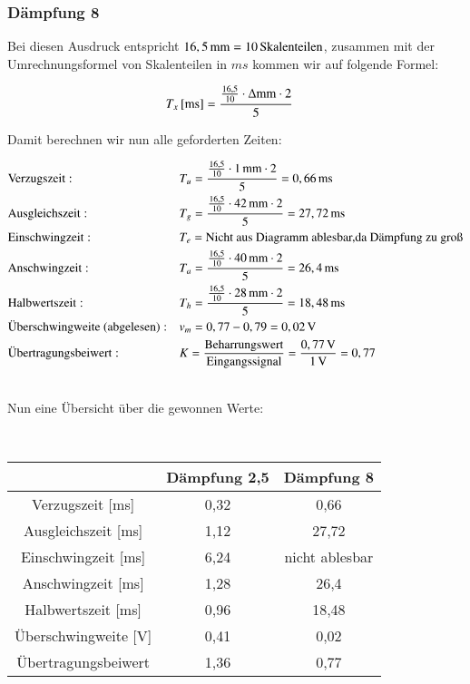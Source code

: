 \newpage

\subsubsection*{Dämpfung 8}


Bei diesen Ausdruck entspricht $\unit[16,5]{mm} = \unit[10]{Skalenteilen}$, zusammen mit der Umrechnungsformel von Skalenteilen in $ms$ kommen wir auf folgende Formel:

\begin{align*}
\unit[T_x]{[ms]} &= \frac{ \frac{16,5}{10} \cdot \Delta \text{mm} \cdot 2}{5}
\end{align*}

Damit berechnen wir nun alle geforderten Zeiten:

\begin{align*}
&\text{Verzugszeit}:  &&T_u = \frac{ \frac{16,5}{10} \cdot \unit[1]{mm} \cdot 2}{5} = \unit[0,66]{ms} \\
&\text{Ausgleichszeit}:  &&T_g = \frac{ \frac{16,5}{10} \cdot \unit[42]{mm} \cdot 2}{5} = \unit[27,72]{ms} \\
&\text{Einschwingzeit}:  &&T_e = \text{Nicht aus Diagramm ablesbar,da Dämpfung zu groß} \\
&\text{Anschwingzeit}:  &&T_a = \frac{ \frac{16,5}{10} \cdot \unit[40]{mm} \cdot 2}{5} = \unit[26,4]{ms} \\
&\text{Halbwertszeit}:  &&T_h = \frac{ \frac{16,5}{10} \cdot \unit[28]{mm} \cdot 2}{5} = \unit[18,48]{ms} \\
&\text{Überschwingweite (abgelesen)}:  &&v_m = 0,77 - 0,79 = \unit[0,02]{V} \\
&\text{Übertragungsbeiwert}:  &&K = \frac{\text{Beharrungswert}}{\text{Eingangssignal}} = \frac{\unit[0,77]{V}}{\unit[1]{V}} = \unit[0,77]{ } \\
\end{align*}

\hfill \\

Nun eine Übersicht über die gewonnen Werte:

\hfill \\

\begin{tabular}{c|c|c}
 & Dämpfung 2,5 & Dämpfung 8 \\ 
\hline 
Verzugszeit [ms] & 0,32 & 0,66 \\ 
\hline 
Ausgleichszeit [ms] & 1,12 & 27,72 \\ 
\hline 
Einschwingzeit [ms] & 6,24 & nicht ablesbar \\ 
\hline 
Anschwingzeit [ms] & 1,28 & 26,4 \\ 
\hline 
Halbwertszeit [ms] & 0,96 & 18,48 \\ 
\hline 
Überschwingweite [V] & 0,41 & 0,02 \\ 
\hline 
Übertragungsbeiwert & 1,36 & 0,77 \\ 
\end{tabular} 


